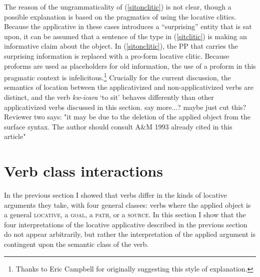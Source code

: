 \documentclass[output=paper]{langsci/langscibook}
\begin{document}
The reason of the ungrammaticality of (\ref{sitonclitic}) is not clear, though a possible explanation is based on the pragmatics of using the locative clitics. Because the applicative in these cases introduces a ``surprising'' entity that is sat upon, it can be assumed that a sentence of the type in (\ref{sitclitic}) is making an informative claim about the object. In (\ref{sitonclitic}), the PP that carries the surprising information is replaced with a pro-form locative clitic. Because proforms are used as placeholders for old information, the use of a proform in this pragmatic context is infelicitous.\footnote{Thanks to Eric Campbell for originally suggesting this style of explanation.} Crucially for the current discussion, the semantics of location between the applicativized and  non-applicativized verbs are distinct, and the verb \emph{kw-icara} `to sit' behaves differently than other applicativized verbs discussed in this section. {\comment say more...? maybe just cut this? Reviewer two says: "it may be due to the deletion of the applied object from the surface syntax. The author should consult A\&M 1993 already cited in this article"}
\fi

\section{Verb class interactions} %
\label{sec:jerro:4}
In the previous section I showed that verbs differ in the kinds of locative arguments they take, with four general classes: verbs where the applied object is a general {\scshape locative}, a {\scshape goal}, a {\scshape path}, or a {\scshape source}.  In this section I show that the four interpretations of the locative applicative described in the previous section do not appear arbitrarily, but rather the interpretation of the applied argument is contingent upon the semantic class of the verb. 
\end{document}
